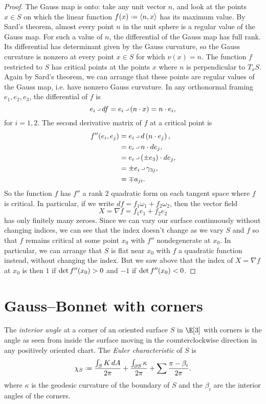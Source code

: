 \begin{proof}
The Gauss map is onto: take any unit vector \(n\), and look at the points \(x \in S\) on which the linear function \(f(x) \defeq \ip{n}{x}\) has its maximum value.
By Sard's theorem, almost every point \(n\) in the unit sphere is a regular value of the Gauss map.
For such a value of \(n\), the differential of the Gauss map has full rank.
Its differential has determinant given by the Gauss curvature, so the Gauss curvature is nonzero at every point \(x \in S\) for which \(\nu(x)=n\).
The function \(f\) restricted to \(S\) has critical points at the points \(x\) where \(n\) is perpendicular to \(T_x S\).
Again by Sard's theorem, we can arrange that these points are regular values of the Gauss map, i.e. have nonzero Gauss curvature.
In any orthonormal framing \(e_1, e_2, e_3\), the differential of \(f\) is
\[
e_i \hook df = e_i \hook \pr{n \cdot x} = n \cdot e_i,
\]
for \(i=1,2\).
The second derivative matrix of \(f\) at a critical point is
\begin{align*}
f''\of{e_i,e_j}
&=
e_i \hook d\pr{n \cdot e_j},
\\
&=
e_i \hook n \cdot de_j,
\\
&=
e_i \hook \pr{\pm e_3} \cdot de_j,
\\
&=
\pm e_i \hook \gamma_{3j},
\\
&=
\mp a_{ji}.
\end{align*}
So the function \(f\) has \(f''\) a rank \(2\) quadratic form on each tangent space where \(f\) is critical.
In particular, if we write \(df = f_1 \omega_1 + f_2 \omega_2\), then the vector field 
\[
X=\nabla f = f_1 e_1 + f_2 e_2
\]
has only finitely many zeroes.
Since we can vary our surface continuously without changing indices, we can see that the index doesn't change as we vary \(S\) and \(f\) so that \(f\) remains critical at some point \(x_0\) with \(f''\) nondegenerate at \(x_0\).
In particular, we can arrange that \(S\) is flat near \(x_0\) with \(f\) a quadratic function instead, without changing the index.
But we saw above that the index of \(X=\nabla f\) at \(x_0\) is then \(1\) if \(\det f''\!\left(x_0\right) > 0\) and \(-1\) if \(\det f''\!\left(x_0\right) < 0\).
\end{proof}

\section{Gauss--Bonnet with corners}
\begin{marginfigure}

\end{marginfigure}
The \emph{interior angle} at a corner of an oriented surface \(S\) in \(\E[3]\) with corners is the angle as seen from inside the surface moving in the counterclockwise direction in any positively oriented chart. 
The \emph{Euler characteristic} of \(S\) is
\[
\chi_S\defeq 
\frac{\int_S K \, dA}{2\pi}
+ \frac{\int_{\partial S} \kappa}{2\pi} 
+ \sum \frac{\pi-\beta_i}{2\pi}.
\]
where \(\kappa\) is the geodesic curvature of the boundary of \(S\) and the \(\beta_i\) are the interior angles of the corners.

